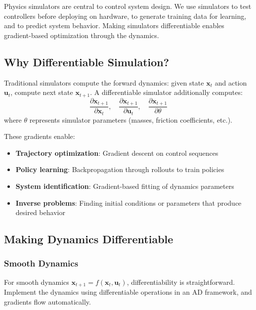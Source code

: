 Physics simulators are central to control system design. We use simulators to test controllers before deploying on hardware, to generate training data for learning, and to predict system behavior. Making simulators differentiable enables gradient-based optimization through the dynamics.

\subsection{Why Differentiable Simulation?}

Traditional simulators compute the forward dynamics: given state $\mathbf{x}_t$ and action $\mathbf{u}_t$, compute next state $\mathbf{x}_{t+1}$. A differentiable simulator additionally computes:
\begin{equation}
\frac{\partial \mathbf{x}_{t+1}}{\partial \mathbf{x}_t}, \quad \frac{\partial \mathbf{x}_{t+1}}{\partial \mathbf{u}_t}, \quad \frac{\partial \mathbf{x}_{t+1}}{\partial \theta}
\end{equation}
where $\theta$ represents simulator parameters (masses, friction coefficients, etc.).

These gradients enable:

\begin{itemize}
    \item \textbf{Trajectory optimization}: Gradient descent on control sequences
    \item \textbf{Policy learning}: Backpropagation through rollouts to train policies
    \item \textbf{System identification}: Gradient-based fitting of dynamics parameters
    \item \textbf{Inverse problems}: Finding initial conditions or parameters that produce desired behavior
\end{itemize}

\subsection{Making Dynamics Differentiable}

\subsubsection{Smooth Dynamics}

For smooth dynamics $\mathbf{x}_{t+1} = f(\mathbf{x}_t, \mathbf{u}_t)$, differentiability is straightforward. Implement the dynamics using differentiable operations in an AD framework, and gradients flow automatically.

